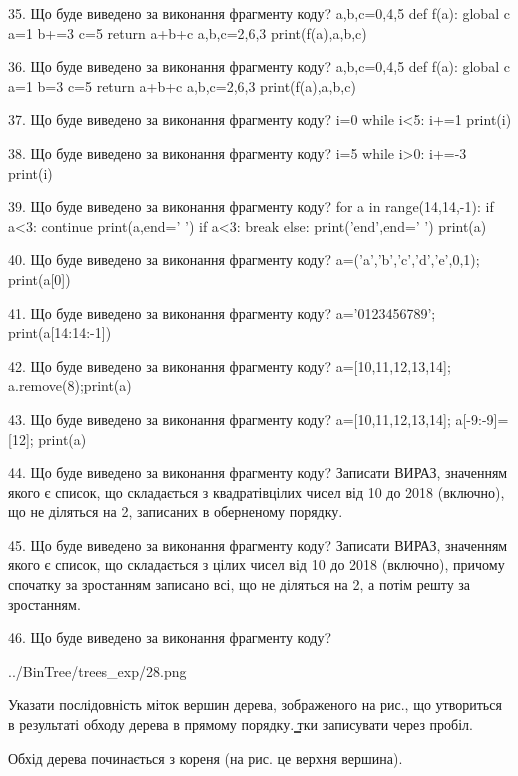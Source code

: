 \documentclass[11pt]{article}
\begin{document}
35. Що буде виведено за виконання фрагменту коду?
a,b,c=0,4,5
    def f(a):
      global c      a=1
      b+=3
      c=5
      return a+b+c
    a,b,c=2,6,3
    print(f(a),a,b,c)

36. Що буде виведено за виконання фрагменту коду?
a,b,c=0,4,5
    def f(a):
      global c      a=1
      b=3
      c=5
      return a+b+c
    a,b,c=2,6,3
    print(f(a),a,b,c)

37. Що буде виведено за виконання фрагменту коду?
i=0
   while i<5: i+=1
   print(i)

38. Що буде виведено за виконання фрагменту коду?
i=5
   while i>0: i+=-3
   print(i)

39. Що буде виведено за виконання фрагменту коду?
for a in range(14,14,-1):
     if a<3: continue
     print(a,end=' ')
     if a<3: break
   else: print('end',end=' ')
   print(a)

40. Що буде виведено за виконання фрагменту коду?
a=('a','b','c','d','e',0,1); print(a[0])

41. Що буде виведено за виконання фрагменту коду?
a='0123456789'; print(a[14:14:-1])

42. Що буде виведено за виконання фрагменту коду?
a=[10,11,12,13,14]; a.remove(8);print(a)

43. Що буде виведено за виконання фрагменту коду?
a=[10,11,12,13,14]; a[-9:-9]=[12]; print(a)

44. Що буде виведено за виконання фрагменту коду?
Записати ВИРАЗ, значенням якого є список, що складається з квадратівцілих чисел від 10 до 2018 (включно), що не діляться на 2, записаних в оберненому порядку.

45. Що буде виведено за виконання фрагменту коду?
Записати ВИРАЗ, значенням якого є список, що складається з цілих чисел від 10 до 2018 (включно), причому спочатку за зростанням записано всі, що не діляться на 2, а потім решту за зростанням.

46. Що буде виведено за виконання фрагменту коду?

\begin{center}
	{../BinTree/trees_exp/28.png}
\end{center}
Указати послідовність міток вершин дерева, зображеного на рис., що утвориться в результаті обходу дерева в прямому порядку. ̳тки записувати через пробіл.\par Обхід дерева починається з кореня (на рис. це верхня вершина).
\end{document}
